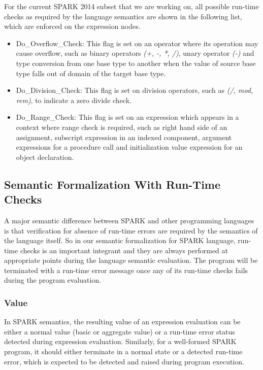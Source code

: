 For the current SPARK 2014 subset that we are working on, all possible run-time
checks as required by the language semantics are shown in the following list,
which are enforced on the expression nodes.
\begin{itemize}
\item 
  Do\_Overflow\_Check: This flag is set on an operator where its operation may
  cause overflow, such as binary operators \textit{(+, -, *, /)}, unary operator
  \textit{(-)} and type conversion from one base type to another when the value
  of source base type falls out of domain of the target base type.
\item 
  Do\_Division\_Check: This flag is set on division operators, such as
  \textit{(/, mod, rem)}, to indicate a zero divide check.
\item 
  Do\_Range\_Check: This flag is set on an expression which appears in a
  context where range check is required, such as right hand side of an
  assignment, subscript expression in an indexed component, argument expressions
  for a procedure call and initialization value expression for an object
  declaration.
\end{itemize}

\subsection{Semantic Formalization With Run-Time Checks}
A major semantic difference between SPARK and other programming languages is
that verification for absence of run-time errors are required by the semantics
of the language itself.
So in our semantic formalization for SPARK language, run-time checks is an
important integrant and they are always performed at appropriate points during
the language semantic evaluation. The program will be terminated with a run-time
error message once any of its run-time checks fails during the program
evaluation.

\subsubsection{Value}
In SPARK semantics, the resulting value of an expression evaluation can be
either a normal value (basic or aggregate value) or a run-time error status
detected during expression evaluation.
Similarly, for a well-formed SPARK program, it should either terminate in a
normal state or a detected run-time error, which is expected to be detected and
raised during program execution.


